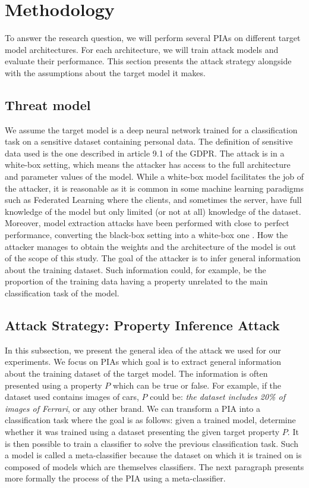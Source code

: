 \documentclass[11pt]{article}
\begin{document}
\section{Methodology}
To answer the research question, we will perform several PIAs on different target model architectures. For each architecture, we will train attack models and evaluate their performance. This section presents the attack strategy alongside with the assumptions about the target model it makes. \\

\subsection{Threat model}

We assume the target model is a deep neural network trained for a classification task on a sensitive dataset containing personal data. The definition of sensitive data used is the one described in article 9.1 of the GDPR. The attack is in a white-box setting, which means the attacker has access to the full architecture and parameter values of the model. While a white-box model facilitates the job of the attacker, it is reasonable as it is common in some machine learning paradigms such as Federated Learning \cite{shokri2015privacy} where the clients, and sometimes the server, have full knowledge of the model but only limited (or not at all) knowledge of the dataset. Moreover, model extraction attacks have been performed with close to perfect performance, converting the black-box setting into a white-box one \cite{DBLP:journals/corr/PapernotMGJCS16}. How the attacker manages to obtain the weights and the architecture of the model is out of the scope of this study. The goal of the attacker is to infer general information about the training dataset. Such information could, for example, be the proportion of the training data having a property unrelated to the main classification task of the model.

\subsection{Attack Strategy: Property Inference Attack}
In this subsection, we present the general idea of the attack we used for our experiments. We focus on PIAs which goal is to extract general information about the training dataset of the target model. The information is often presented using a property $P$ which can be true or false. For example, if the dataset used contains images of cars, $P$ could be: \textit{the dataset includes 20\% of images of Ferrari}, or any other brand. We can transform a PIA into a classification task where the goal is as follows: given a trained model, determine whether it was trained using a dataset presenting the given target property $P$. It is then possible to train a classifier to solve the previous classification task. Such a model is called a meta-classifier because the dataset on which it is trained on is composed of models which are themselves classifiers. The next paragraph presents more formally the process of the PIA using a meta-classifier.
\end{document}

